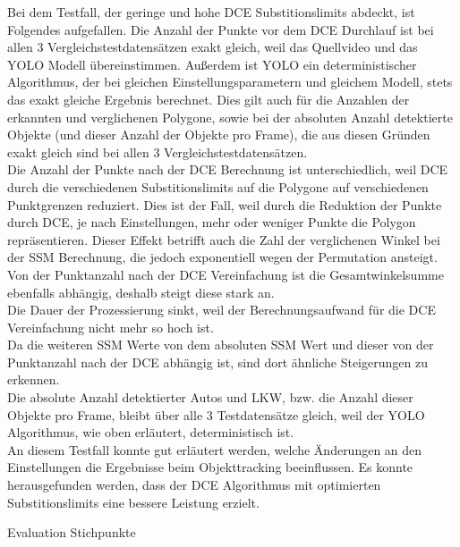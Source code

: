 {{		Bei dem Testfall, der geringe und hohe DCE Substitionslimits abdeckt, ist Folgendes aufgefallen. Die Anzahl der Punkte vor dem DCE Durchlauf ist bei allen 3 Vergleichstestdatensätzen exakt gleich, weil das Quellvideo und das YOLO Modell übereinstimmen. Außerdem ist YOLO ein deterministischer Algorithmus, der bei gleichen Einstellungsparametern und gleichem Modell, stets das exakt gleiche Ergebnis berechnet. Dies gilt auch für die Anzahlen der erkannten und verglichenen Polygone, sowie bei der absoluten Anzahl detektierte Objekte (und dieser Anzahl der Objekte pro Frame), die aus diesen Gründen exakt gleich sind bei allen 3 Vergleichstestdatensätzen. \\
		Die Anzahl der Punkte nach der DCE Berechnung ist unterschiedlich, weil DCE durch die verschiedenen Substitionslimits auf die Polygone auf verschiedenen Punktgrenzen reduziert. Dies ist der Fall, weil durch die Reduktion der Punkte durch DCE, je nach Einstellungen, mehr oder weniger Punkte die Polygon repräsentieren. Dieser Effekt betrifft auch die Zahl der verglichenen Winkel bei der SSM Berechnung, die jedoch exponentiell wegen der Permutation ansteigt. Von der Punktanzahl nach der DCE Vereinfachung ist die Gesamtwinkelsumme ebenfalls abhängig, deshalb steigt diese stark an. \\
		Die Dauer der Prozessierung sinkt, weil der Berechnungsaufwand für die DCE Vereinfachung nicht mehr so hoch ist. \\
		Da die weiteren SSM Werte von dem absoluten SSM Wert und dieser von der Punktanzahl nach der DCE abhängig ist, sind dort ähnliche Steigerungen zu erkennen. \\
		Die absolute Anzahl detektierter Autos und LKW, bzw. die Anzahl dieser Objekte pro Frame, bleibt über alle 3 Testdatensätze gleich, weil der YOLO Algorithmus, wie oben erläutert, deterministisch ist. \\
		An diesem Testfall konnte gut erläutert werden, welche Änderungen an den Einstellungen die Ergebnisse beim Objekttracking beeinflussen. Es konnte herausgefunden werden, dass der DCE Algorithmus mit optimierten Substitionslimits eine bessere Leistung erzielt. \\


		




	}

	Evaluation Stichpunkte
	\begin{itemize}
		
		
	

\end{itemize}}
